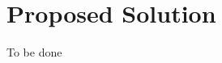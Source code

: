 \documentclass[conference]{IEEEtran}
\begin{document}
	\section{Proposed Solution}
To be done
\end{document}
